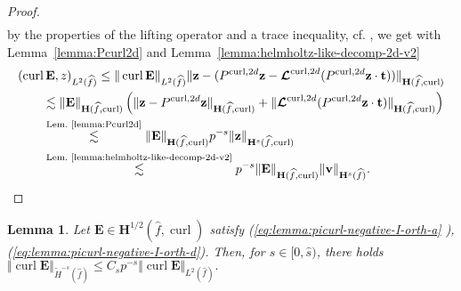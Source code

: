 \documentclass{article}
\newtheorem{lemma}[theorem]{Lemma}
\begin{document}
\begin{proof}
\begin{align*}
\end{align*}
by the properties of the lifting operator and a trace inequality, cf. \cite[eq. (154)]{demkowicz08}, we get with Lemma~\ref{lemma:Pcurl2d} and Lemma~\ref{lemma:helmholtz-like-decomp-2d-v2}
\begin{align}
\label{eq:lemma:picurl-negative-I-IMPORTANT}
&(\operatorname{curl}{\mathbf{E}},z)_{L^{2}(\widehat{f})} \leq \|\operatorname{curl}\mathbf{E}\|_{L^2(\widehat{f})} \|\mathbf{z}-(P^{\operatorname*{curl},2d}{\mathbf{z}} - \boldsymbol{\mathcal{L}}^{\operatorname*{curl},2d}(P^{\operatorname*{curl},2d}{\mathbf{z}} \cdot \mathbf{t}))\|_{\mathbf{H}(\widehat{f},\operatorname{curl})} \\
&\qquad \lesssim \|\mathbf{E}\|_{\mathbf{H}(\widehat{f},\operatorname{curl})} \left(\|\mathbf{z}-P^{\operatorname*{curl},2d}{\mathbf{z}}\|_{\mathbf{H}(\widehat{f},\operatorname{curl})} + \|\boldsymbol{\mathcal{L}}^{\operatorname*{curl},2d}(P^{\operatorname*{curl},2d}{\mathbf{z}} \cdot \mathbf{t})\|_{\mathbf{H}(\widehat{f},\operatorname{curl})}\right) \\
&\qquad \stackrel{\text{Lem.~\ref{lemma:Pcurl2d}}}{\lesssim} \|\mathbf{E}\|_{\mathbf{H}(\widehat{f},\operatorname{curl})} p^{-s} \Vert{\mathbf{z}}\Vert_{\mathbf{H}^{s}(\widehat{f},\operatorname{curl})} \\
&\qquad \stackrel{\text{Lem.~\ref{lemma:helmholtz-like-decomp-2d-v2}}}{\lesssim} p^{-s} \Vert\mathbf{E}\Vert_{\mathbf{H}(\widehat{f},\operatorname{curl})}\Vert{\mathbf{v}} \Vert_{{\mathbf{H}}^{s}(\widehat{f})}.
\end{align}
\end{proof}

\begin{lemma}
\label{lemma:picurl-negative-II} 
Let ${\mathbf{E}}\in\mathbf{H}^{1/2}(\widehat{f},\operatorname*{curl})$ satisfy (\ref{eq:lemma:picurl-negative-I-orth-a}%
), (\ref{eq:lemma:picurl-negative-I-orth-d}). Then, for $s\in [0,\widehat{s})$, there holds 
$\displaystyle 
\Vert\operatorname{curl}{\mathbf{E}}\Vert_{\widetilde{H}^{-s}(\widehat{f})}%
\leq C_s p^{-s}\Vert\operatorname{curl}{\mathbf{E}%
}\Vert_{L^{2}(\widehat{f})}. %
$

\end{lemma}
\end{document}
